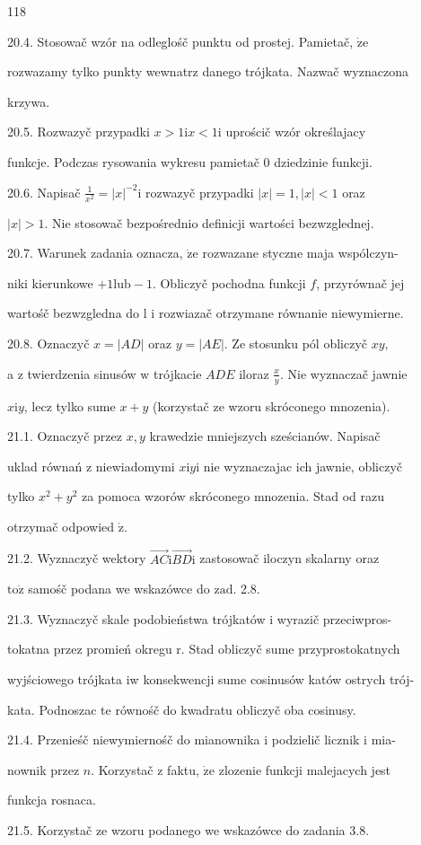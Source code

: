 \documentclass[a4paper,12pt]{article}
\begin{document}
118

20.4. Stosowač wzór na odleglośč punktu od prostej. Pamietač, $\dot{\mathrm{z}}\mathrm{e}$

rozwazamy tylko punkty wewnatrz danego trójkata. Nazwač wyznaczona

krzywa.

20.5. Rozwazyč przypadki $x > 1 \mathrm{i}x < 1 \mathrm{i}$ uprościč wzór określajacy

funkcje. Podczas rysowania wykresu pamietač $0$ dziedzinie funkcji.

20.6. Napisač $\displaystyle \frac{1}{x^{2}} = |x|^{-2}\mathrm{i}$ rozwazyč przypadki $|x| =1, |x| < 1$ oraz

$|x|>1$. Nie stosowač bezpośrednio definicji wartości bezwzglednej.

20.7. Warunek zadania oznacza, $\dot{\mathrm{z}}\mathrm{e}$ rozwazane styczne maja wspólczyn-

niki kierunkowe $+1\mathrm{l}\mathrm{u}\mathrm{b}-1$. Obliczyč pochodna funkcji $f$, przyrównač jej

wartośč bezwzgledna do l $\mathrm{i}$ rozwiazač otrzymane równanie niewymierne.

20.8. Oznaczyč $x=|AD|$ oraz $y=|AE|$. Ze stosunku pól obliczyč $xy,$

a $\mathrm{z}$ twierdzenia sinusów $\mathrm{w}$ trójkacie $ADE$ iloraz $\displaystyle \frac{x}{y}$. Nie wyznaczač jawnie

$x\mathrm{i}y$, lecz tylko sume $x+y$ (korzystač ze wzoru skróconego mnozenia).

21.1. Oznaczyč przez $x, y$ krawedzie mniejszych sześcianów. Napisač

uklad równań $\mathrm{z}$ niewiadomymi $x\mathrm{i}y\mathrm{i}$ nie wyznaczajac ich jawnie, obliczyč

tylko $x^{2} +y^{2}$ za pomoca wzorów skróconego mnozenia. Stad od razu

otrzymač odpowied $\acute{\mathrm{z}}.$

21.2. Wyznaczyč wektory $\vec{AC}\mathrm{i}\vec{BD}\mathrm{i}$ zastosowač iloczyn skalarny oraz

$\mathrm{t}\mathrm{o}\dot{\mathrm{z}}$ samośč podana we wskazówce do $\mathrm{z}\mathrm{a}\mathrm{d}$. 2.8.

21.3. Wyznaczyč skale podobieństwa trójkatów i wyrazič przeciwpros-

tokatna przez promień okregu r. Stad obliczyč sume przyprostokatnych

wyjściowego trójkata iw konsekwencji sume cosinusów katów ostrych trój-

kata. Podnoszac te równośč do kwadratu obliczyč oba cosinusy.

21.4. Przenieśč niewymiernośč do mianownika $\mathrm{i}$ podzielič licznik $\mathrm{i}$ mia-

nownik przez $n$. Korzystač $\mathrm{z}$ faktu, $\dot{\mathrm{z}}\mathrm{e}$ zlozenie funkcji malejacych jest

funkcja rosnaca.

21.5. Korzystač ze wzoru podanego we wskazówce do zadania 3.8.
\end{document}
